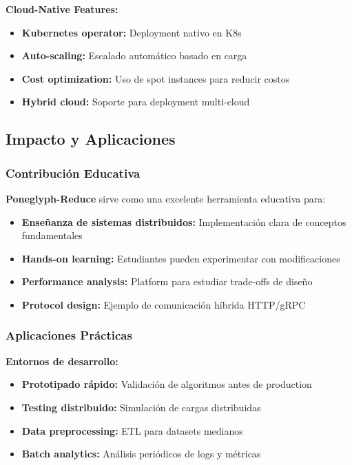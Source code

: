 \textbf{Cloud-Native Features:}
\begin{itemize}
    \item \textbf{Kubernetes operator:} Deployment nativo en K8s
    \item \textbf{Auto-scaling:} Escalado automático basado en carga
    \item \textbf{Cost optimization:} Uso de spot instances para reducir costos
    \item \textbf{Hybrid cloud:} Soporte para deployment multi-cloud
\end{itemize}

\subsection{Impacto y Aplicaciones}

\subsubsection{Contribución Educativa}

\textbf{Poneglyph-Reduce} sirve como una excelente herramienta educativa para:

\begin{itemize}
    \item \textbf{Enseñanza de sistemas distribuidos:} Implementación clara de conceptos fundamentales
    \item \textbf{Hands-on learning:} Estudiantes pueden experimentar con modificaciones
    \item \textbf{Performance analysis:} Platform para estudiar trade-offs de diseño
    \item \textbf{Protocol design:} Ejemplo de comunicación híbrida HTTP/gRPC
\end{itemize}

\subsubsection{Aplicaciones Prácticas}

\textbf{Entornos de desarrollo:}
\begin{itemize}
    \item \textbf{Prototipado rápido:} Validación de algoritmos antes de production
    \item \textbf{Testing distribuido:} Simulación de cargas distribuidas
    \item \textbf{Data preprocessing:} ETL para datasets medianos
    \item \textbf{Batch analytics:} Análisis periódicos de logs y métricas
\end{itemize}

